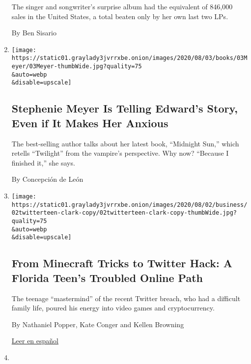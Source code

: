 \begin{enumerate}
  The singer and songwriter's surprise album had the equivalent of
  846,000 sales in the United States, a total beaten only by her own
  last two LPs.

  By Ben Sisario
\item
  \href{/2020/08/03/books/midnight-sun-stephenie-meyer-twilight.html}{}

  \texttt{[image: https://static01.graylady3jvrrxbe.onion/images/2020/08/03/books/03Meyer/03Meyer-thumbWide.jpg?quality=75\\\&auto=webp\\\&disable=upscale]}

  \hypertarget{stephenie-meyer-is-telling-edwards-story-even-if-it-makes-her-anxious}{%
  \subsection{Stephenie Meyer Is Telling Edward's Story, Even if It
  Makes Her
  Anxious}\label{stephenie-meyer-is-telling-edwards-story-even-if-it-makes-her-anxious}}

  The best-selling author talks about her latest book, ``Midnight Sun,''
  which retells ``Twilight'' from the vampire's perspective. Why now?
  ``Because I finished it,'' she says.

  By Concepción de León
\item
  \href{/2020/08/02/technology/florida-teenager-twitter-hack.html}{}

  \texttt{[image: https://static01.graylady3jvrrxbe.onion/images/2020/08/02/business/02twitterteen-clark-copy/02twitterteen-clark-copy-thumbWide.jpg?quality=75\\\&auto=webp\\\&disable=upscale]}

  \hypertarget{from-minecraft-tricks-to-twitter-hack-a-florida-teens-troubled-online-path}{%
  \subsection{From Minecraft Tricks to Twitter Hack: A Florida Teen's
  Troubled Online
  Path}\label{from-minecraft-tricks-to-twitter-hack-a-florida-teens-troubled-online-path}}

  The teenage ``mastermind'' of the recent Twitter breach, who had a
  difficult family life, poured his energy into video games and
  cryptocurrency.

  By Nathaniel Popper, Kate Conger and Kellen Browning

  \href{https://www.nytimes3xbfgragh.onion/es/2020/08/04/espanol/negocios/joven-florida-hacker-twitter.html}{Leer
  en español}
\item
  \href{/2020/08/02/business/media/election-coverage.html}{}


\end{enumerate}
